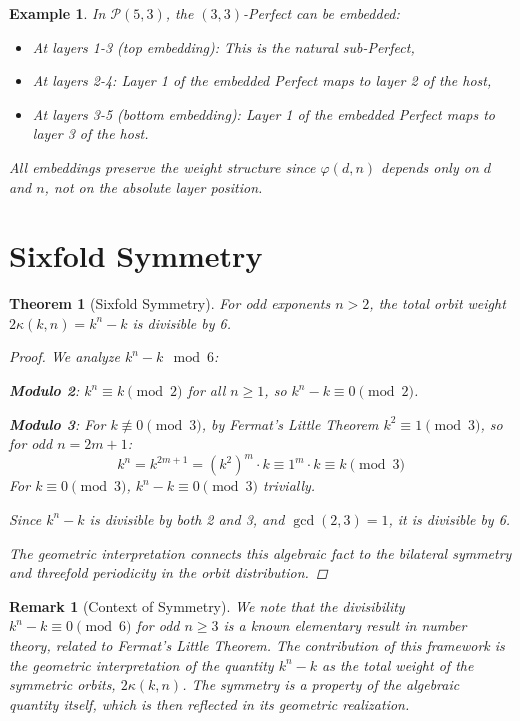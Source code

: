 \documentclass[11pt]{article}
\newcommand{\perfect}{\mathcal{P}}
\newtheorem{theorem}[definition]{Theorem}
\newtheorem{example}[definition]{Example}
\newtheorem{remark}[definition]{Remark}
\begin{document}
\begin{example}\label{ex:embedding}
In $\perfect(5,3)$, the $(3,3)$-Perfect can be embedded:
\begin{itemize}
    \item At layers 1-3 (top embedding): This is the natural sub-Perfect,
    \item At layers 2-4: Layer 1 of the embedded Perfect maps to layer 2 of the host,
    \item At layers 3-5 (bottom embedding): Layer 1 of the embedded Perfect maps to layer 3 of the host.
\end{itemize}
All embeddings preserve the weight structure since $\varphi(d,n)$ depends only on $d$ and $n$, not on the absolute layer position.
\end{example}



\section{Sixfold Symmetry}\label{sec:sixfold-symmetry}

\begin{theorem}[Sixfold Symmetry]\label{thm:sixfold}
For odd exponents $n > 2$, the total orbit weight $2\kappa(k,n) = k^n - k$ is divisible by 6.
\begin{proof}
We analyze $k^n - k \mod 6$:

\textbf{Modulo 2}: $k^n \equiv k \pmod{2}$ for all $n \geq 1$, so $k^n - k \equiv 0 \pmod{2}$.

\textbf{Modulo 3}: For $k \not\equiv 0 \pmod{3}$, by Fermat's Little Theorem $k^2 \equiv 1 \pmod{3}$, so for odd $n = 2m+1$:
\[
k^n = k^{2m+1} = (k^2)^m \cdot k \equiv 1^m \cdot k \equiv k \pmod{3}
\]
For $k \equiv 0 \pmod{3}$, $k^n - k \equiv 0 \pmod{3}$ trivially.

Since $k^n - k$ is divisible by both 2 and 3, and $\gcd(2,3)=1$, it is divisible by 6.

The geometric interpretation connects this algebraic fact to the bilateral symmetry and threefold periodicity in the orbit distribution.
\end{proof}
\end{theorem}

\begin{remark}[Context of Symmetry]\label{rem:sixfold-context}
We note that the divisibility $k^n - k \equiv 0 \pmod{6}$ for odd $n \geq 3$ is a known elementary result in number theory, related to Fermat's Little Theorem. The contribution of this framework is the geometric interpretation of the quantity $k^n - k$ as the total weight of the symmetric orbits, $2\kappa(k,n)$. The symmetry is a property of the algebraic quantity itself, which is then reflected in its geometric realization.
\end{remark}
\end{document}
